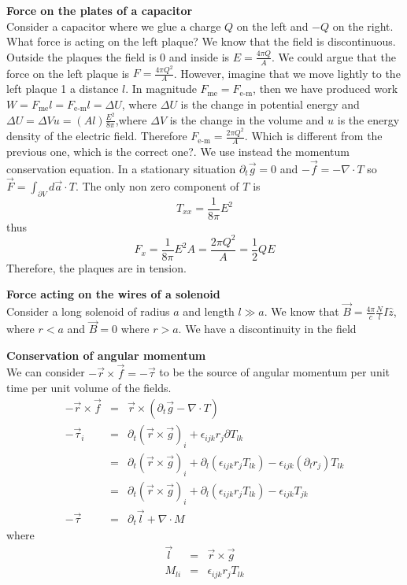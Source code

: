\documentclass[12pt,a4paper]{article}
\begin{document}
\textbf{Force on the plates of a capacitor}\\
Consider a capacitor where we glue a charge $Q$ on the left and $-Q$ on the right. What force is acting on the left plaque? We know that the field is discontinuous. Outside the plaques the field is 0 and inside is $E = \frac{4\pi Q}{A}$. We could argue that the force on the left plaque is $F  = \frac{4\pi Q^2}{A}$. However, imagine that we move lightly to the left plaque 1 a distance $l$. In magnitude $F_{\text{me}} = F_{\text{e-m}}$, then we have produced work $W = F_{\text{me}} l = F_{\text{e-m}} l= \Delta U$, where $\Delta U$ is the change in potential energy and $\Delta U = \Delta V u = (A l)\frac{E^2}{8\pi}$,where $\Delta V$ is the change in the volume and $u$ is the energy density of the electric field. Therefore $F_{\text{e-m}} = \frac{2\pi Q^2}{A}$. Which is different from the previous one, which is the correct one?. We use instead the momentum conservation equation. In a stationary situation $\partial_t\vec{g} = 0$ and
$-\vec{f} = -\nabla \cdot T$ so $\vec{F} = \int_{\partial V} d\vec{a}\cdot T$. The only non zero component of $T$ is
\begin{equation}
	T_{xx} = \frac{1}{8\pi}E^2
\end{equation}
thus
\begin{equation}
	F_x = \frac{1}{8\pi}E^2 A = \frac{2\pi Q^2}{A} = \frac{1}{2}Q E
\end{equation}
Therefore, the plaques are in tension.

\textbf{Force acting on the wires of a solenoid}\\
Consider a long solenoid of radius $a$ and length $l \gg a$.  We know that $\vec{B} = \frac{4\pi}{c}\frac{N}{l} I \hat{z}$, where $r<a$ and $\vec{B} = 0$ where $r>a$. We have a discontinuity in the field

\textbf{Conservation of angular momentum}\\
We can consider $-\vec{r}\times \vec{f}=-\vec{\tau}$ to be the source of angular momentum per unit time per unit volume of the fields.
\begin{eqnarray}
	-\vec{r}\times \vec{f} & = & \vec{r}\times(\partial_t \vec{g} - \nabla\cdot T) \\
	-\vec{\tau}_i & = & \partial_t(\vec{r}\times\vec{g})_i  + \epsilon_{ijk}r_j\partial T_{lk} \\
	& = & \partial_t(\vec{r}\times\vec{g})_i + \partial_l (\epsilon_{ijk}r_jT_{lk}) - \epsilon_{ijk}(\partial_l r_j)T_{lk} \\
	& = & \partial_t(\vec{r}\times\vec{g})_i + \partial_l (\epsilon_{ijk}r_jT_{lk}) - \epsilon_{ijk}T_{jk}\\
	-\vec{\tau} & = & \partial_t \vec{l} + \nabla\cdot M
\end{eqnarray}
where
\begin{eqnarray}
	\vec{l} & = & \vec{r}\times \vec{g}\\
	M_{li} & = & \epsilon_{ijk}r_j T_{lk}
\end{eqnarray}
\end{document}

